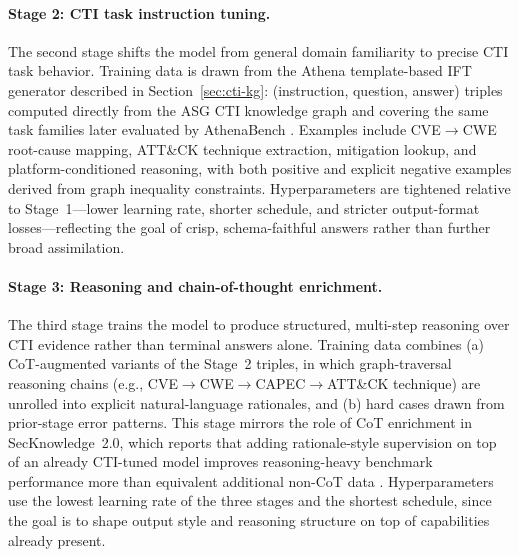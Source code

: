 \documentclass[unnumsec,webpdf,contemporary,large]{oup-authoring-template}
\theoremstyle{thmstyleone}
\theoremstyle{thmstyletwo}
\theoremstyle{thmstylethree}
\begin{document}
\paragraph{Stage 2: CTI task instruction tuning.}
The second stage shifts the model from general domain familiarity to precise CTI task behavior. Training data is drawn from the Athena template-based IFT generator described in Section~\ref{sec:cti-kg}: (instruction, question, answer) triples computed directly from the ASG CTI knowledge graph and covering the same task families later evaluated by AthenaBench \cite{cardei2025ift,alam2025athenabench}. Examples include CVE$\rightarrow$CWE root-cause mapping, ATT\&CK technique extraction, mitigation lookup, and platform-conditioned reasoning, with both positive and explicit negative examples derived from graph inequality constraints. Hyperparameters are tightened relative to Stage~1---lower learning rate, shorter schedule, and stricter output-format losses---reflecting the goal of crisp, schema-faithful answers rather than further broad assimilation.

\paragraph{Stage 3: Reasoning and chain-of-thought enrichment.}
The third stage trains the model to produce structured, multi-step reasoning over CTI evidence rather than terminal answers alone. Training data combines (a) CoT-augmented variants of the Stage~2 triples, in which graph-traversal reasoning chains (e.g., CVE$\rightarrow$CWE$\rightarrow$CAPEC$\rightarrow$ATT\&CK technique) are unrolled into explicit natural-language rationales, and (b) hard cases drawn from prior-stage error patterns. This stage mirrors the role of CoT enrichment in SecKnowledge~2.0, which reports that adding rationale-style supervision on top of an already CTI-tuned model improves reasoning-heavy benchmark performance more than equivalent additional non-CoT data \cite{wei2022cot,levi2025toward}. Hyperparameters use the lowest learning rate of the three stages and the shortest schedule, since the goal is to shape output style and reasoning structure on top of capabilities already present.
\end{document}
